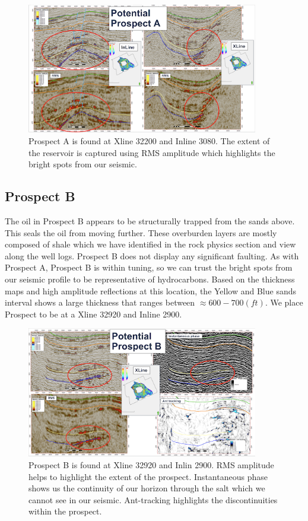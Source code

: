 \documentclass[fleqn]{article}
\begin{document}
\begin{figure}[H]
    \centering
    \includegraphics[width=0.9\textwidth]{Images/ProspectA.png}
    \caption{Prospect A is found at Xline 32200 and Inline 3080. The extent of the reservoir is captured using RMS amplitude which highlights the bright spots from our seismic.}
    \label{fig:ProspectA}
\end{figure}

\subsection{Prospect B}

The oil in Prospect B appears to be structurally trapped from the sands above. This seals the oil from moving further. These overburden layers are mostly composed of shale which we have identified in the rock physics section and view along the well logs. Prospect B does not display any significant faulting. As with Prospect A, Prospect B is within tuning, so we can trust the bright spots from our seismic profile to be representative of hydrocarbons. Based on the thickness maps and high amplitude reflections at this location, the Yellow and Blue sands interval shows a large thickness that ranges between $\approx 600 - 700 (ft)$. We place Prospect to be at a Xline 32920 and Inline 2900.

\begin{figure}[H]
    \centering
    \includegraphics[width=0.9\textwidth]{Images/ProspectB.png}
    \caption{Prospect B is found at Xline 32920 and Inlin 2900. RMS amplitude helps to highlight the extent of the prospect. Instantaneous phase shows us the continuity of our horizon through the salt which we cannot see in our seismic. Ant-tracking highlights the discontinuities within the prospect.}
    \label{fig:ProspectB}
\end{figure}
\end{document}

